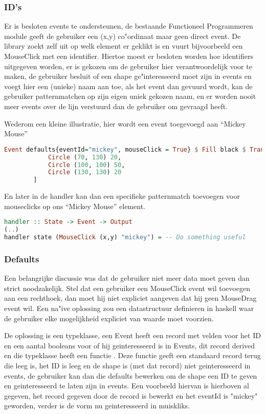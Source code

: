 \subsubsection{ID's}
Er is besloten events te ondersteunen, de bestaande Functioneel Programmeren module geeft de gebruiker een (x,y) co"ordinaat maar geen direct event. De library zoekt zelf uit op welk element er geklikt is en vuurt bijvoorbeeld een MouseClick met een identifier. Hiertoe moest er besloten worden hoe identifiers uitgegeven worden, er is gekozen om de gebruiker hier verantwoordelijk voor te maken, de gebruiker besluit of een shape ge"interesseerd moet zijn in events en voegt hier een (unieke) naam aan toe, als het event dan gevuurd wordt, kan de gebruiker patternmatchen op zijn eigen uniek gekozen naam, en er worden nooit meer events over de lijn verstuurd dan de gebruiker om gevraagd heeft.

Wederom een kleine illustratie, hier wordt een event toegevoegd aan ``Mickey Mouse''

\begin{lstlisting}[style=densecode, language=Haskell]
Event defaults{eventId="mickey", mouseClick = True} $ Fill black $ Translate 100 100 $ Rotate 90 $ Container 200 200 [
            Circle (70, 130) 20,
            Circle (100, 100) 50,
            Circle (130, 130) 20
        ]
\end{lstlisting}

En later in de handler kan dan een specifieke patternmatch toevoegen voor mouseclicks op ons ``Mickey Mouse'' element.
\begin{lstlisting}[style=densecode, language=Haskell]
handler :: State -> Event -> Output
(..)
handler state (MouseClick (x,y) "mickey") = -- Do something useful
\end{lstlisting}

\subsubsection{Defaults}
Een belangrijke discussie was dat de gebruiker niet meer data moet geven dan strict noodzakelijk. Stel dat een gebruiker een MouseClick event wil toevoegen aan een rechthoek, dan moet hij niet expliciet aangeven dat hij geen MouseDrag event wil. Een na"ive oplossing zou een datastructuur definieren in haskell waar de gebruiker elke mogelijkheid expliciet van waarde moet voorzien.

De oplossing is een  typeklasse, een Event heeft een record met velden voor het ID en een aantal booleans voor of hij geinteresseerd is in Events, dit record derived  en die typeklasse heeft een functie . Deze functie geeft een standaard record terug die leeg is, het ID is leeg en de shape is (met dat record) niet geinteresseerd in events, de gebruiker kan dan die defaults bewerken om de shape een ID te geven en geinteresseerd te laten zijn in events. Een voorbeeld hiervan is hierboven al gegeven, het record gegeven door de  record is bewerkt en het eventId is "mickey" geworden, verder is de vorm nu geinteresseerd in muiskliks.

